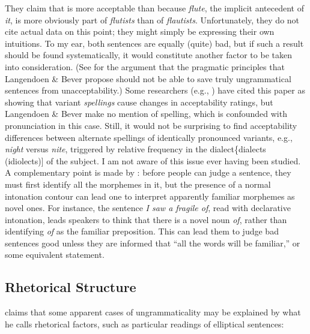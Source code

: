  \noindent
They claim that  is more acceptable than  because \textit{flute}, the implicit antecedent of \textit{it}, is more obviously part of \textit{flutists} than of \textit{flautists}. Unfortunately, they do not cite actual data on this point; they might simply be expressing their own intuitions. To my ear, both sentences are equally (quite) bad, but if such a result should be found systematically, it would constitute another factor to be taken into consideration. (See \citealt{Smith1981} for the argument that the pragmatic principles that Langendoen \& Bever propose should not be able to save truly ungrammatical sentences from unacceptability.) Some researchers (e.g., \citealt{Birdsong1989}) have cited this paper as showing that variant \textit{spellings} cause changes in acceptability ratings, but Langendoen \& Bever make no mention of spelling, which is confounded with pronunciation in this case. Still, it would not be surprising to find acceptability differences between alternate spellings of identically pronounced variants, e.g., \textit{night} versus \textit{nite}, triggered by relative frequency in the dialect\{dialects (idiolects)] of the subject. I am not aware of this issue ever having been studied. A
complementary point is made by \citet{Hill1961}: before people can judge a sentence, they must first identify all the morphemes in it, but the presence of a normal intonation contour can lead one to interpret apparently familiar morphemes as novel ones. For instance, the sentence \textit{I saw a fragile of}, read with declarative intonation, leads speakers to think that there is a novel noun \textit{of}, rather than identifying \textit{of} as the familiar preposition. This can lead them to judge bad sentences good unless they are informed that ``all the words will be familiar,'' or some equivalent statement.

\subsection{Rhetorical Structure}\label{sec:5.3.7} 

\citet{Langendoen1972} claims that some apparent cases of ungrammaticality may be explained by what he calls rhetorical factors, such as particular readings of elliptical sentences:

